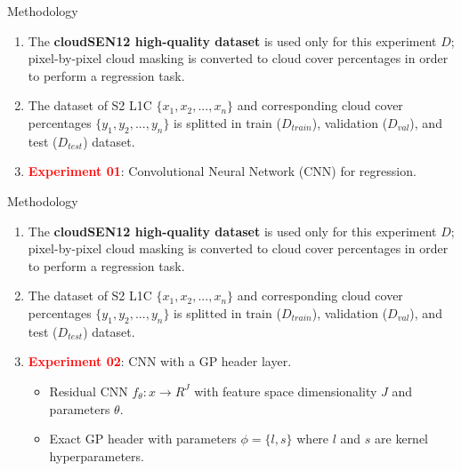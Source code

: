 \begin{frame}{Methodology}	
	\begin{enumerate}
		\item  The \textbf{cloudSEN12 high-quality dataset} is used only for this experiment $D$; pixel-by-pixel cloud masking is converted to cloud cover percentages in order to perform a regression task.
		\item The dataset of S2 L1C $\{x_1, x_2, ..., x_n\}$ and corresponding cloud cover percentages $\{y_1, y_2, ..., y_n\}$ is splitted in train ($D_{train}$), validation ($D_{val}$), and test ($D_{test}$) dataset.
		\item \textcolor{red}{\textbf{Experiment 01}}: Convolutional Neural Network (CNN) for regression.
	\end{enumerate}
\end{frame}



\begin{frame}{Methodology}	
	\begin{enumerate}
		\item  The \textbf{cloudSEN12 high-quality dataset} is used only for this experiment $D$; pixel-by-pixel cloud masking is converted to cloud cover percentages in order to perform a regression task.
		\item The dataset of S2 L1C $\{x_1, x_2, ..., x_n\}$ and corresponding cloud cover percentages $\{y_1, y_2, ..., y_n\}$ is splitted in train ($D_{train}$), validation ($D_{val}$), and test ($D_{test}$) dataset.		
		\item \textcolor{red}{\textbf{Experiment 02}}: CNN with a GP header layer.
		\begin{itemize}
			\item Residual CNN $f_\theta: x \rightarrow R^J$ with feature space dimensionality $J$ and parameters $\theta$.
			\item Exact GP header with parameters $\phi = \{l, s\}$ where $l$ and $s$ are kernel hyperparameters.			
		\end{itemize}		
	\end{enumerate}
\end{frame}


